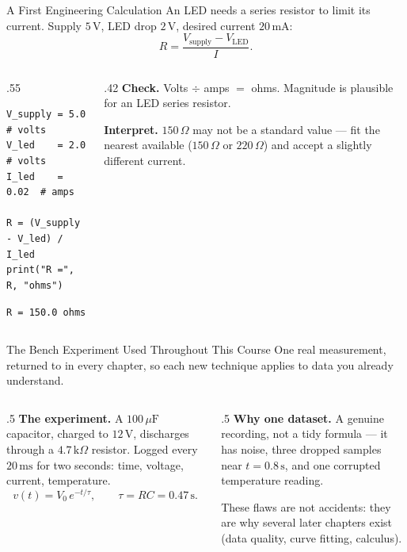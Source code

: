\documentclass[9pt,aspectratio=169,xcolor=table]{beamer}
\begin{document}
\begin{frame}[fragile]{A First Engineering Calculation}
    \leavevmode
    An LED needs a series resistor to limit its current. Supply
    $5\,\text{V}$, LED drop $2\,\text{V}$, desired current $20\,\text{mA}$:
    \[
    R = \frac{V_{\text{supply}} - V_{\text{LED}}}{I}.
    \]

    \begin{columns}[t]
        \begin{column}{.55\textwidth}
\begin{lstlisting}
V_supply = 5.0   # volts
V_led    = 2.0   # volts
I_led    = 0.02  # amps

R = (V_supply - V_led) / I_led
print("R =", R, "ohms")
\end{lstlisting}
            \texttt{R = 150.0 ohms}
        \end{column}
        \begin{column}{.42\textwidth}
            \small
            \textbf{Check.} Volts $\div$ amps $=$ ohms. Magnitude is
            plausible for an LED series resistor.

            \vspace{2mm}
            \textbf{Interpret.} $150\,\Omega$ may not be a standard value
            --- fit the nearest available ($150\,\Omega$ or
            $220\,\Omega$) and accept a slightly different current.
        \end{column}
    \end{columns}
\end{frame}

\begin{frame}{The Bench Experiment Used Throughout This Course}
    \leavevmode
    \small
    One real measurement, returned to in every chapter, so each new
    technique applies to data you already understand.

    \vspace{2mm}
    \begin{columns}[t]
        \begin{column}{.5\textwidth}
            \textbf{The experiment.} A $100\,\mu\text{F}$ capacitor,
            charged to $12\,\text{V}$, discharges through a
            $4.7\,\text{k}\Omega$ resistor. Logged every $20\,\text{ms}$
            for two seconds: time, voltage, current, temperature.
            \[
            v(t) = V_0\,e^{-t/\tau}, \qquad \tau = RC = 0.47\,\text{s}.
            \]
        \end{column}
        \begin{column}{.5\textwidth}
            \textbf{Why one dataset.} A genuine recording, not a tidy
            formula --- it has noise, three dropped samples near
            $t=0.8\,\text{s}$, and one corrupted temperature reading.

            \vspace{2mm}
            These flaws are not accidents: they are why several later
            chapters exist (data quality, curve fitting, calculus).
        \end{column}
    \end{columns}
\end{frame}
\end{document}
